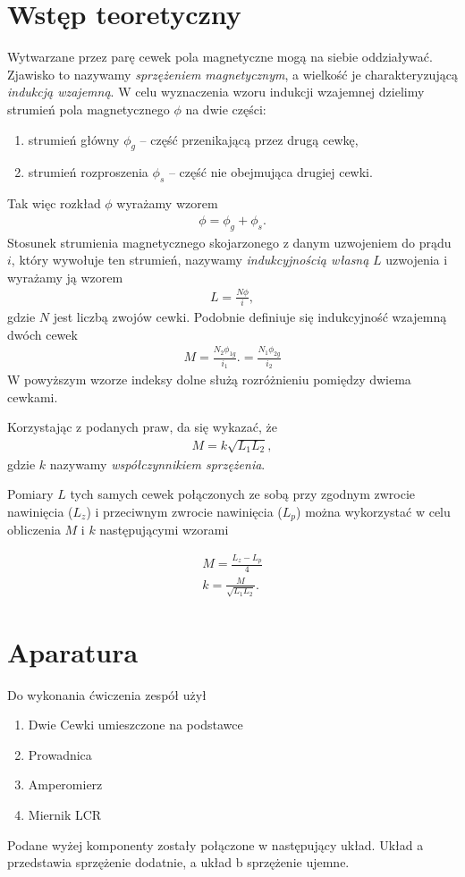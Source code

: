 \documentclass{article}
\begin{document}
\section{Wstęp teoretyczny}
Wytwarzane przez parę cewek pola magnetyczne mogą na siebie
oddziaływać.
Zjawisko to nazywamy \emph{sprzężeniem magnetycznym}, a wielkość je
charakteryzującą \emph{indukcją wzajemną}. W celu wyznaczenia wzoru
indukcji wzajemnej dzielimy strumień pola magnetycznego $\phi$ na
dwie części:
\begin{enumerate}
    \item strumień główny $\phi_g$ -- część przenikającą przez drugą cewkę,
    \item strumień rozproszenia $\phi_s$ -- część nie obejmująca
    drugiej cewki.
\end{enumerate}
Tak więc rozkład $\phi$ wyrażamy wzorem
\begin{align*}
    \phi = \phi_g + \phi_s.
\end{align*}
Stosunek strumienia magnetycznego skojarzonego z danym uzwojeniem do prądu $i$, który wywołuje ten
strumień, nazywamy \emph{indukcyjnością własną} $L$ uzwojenia i
wyrażamy ją wzorem
\begin{align*}
    L = \frac{N\phi}{i},
\end{align*}
gdzie $N$ jest liczbą zwojów cewki. Podobnie definiuje się indukcyjność
wzajemną dwóch cewek
\begin{align*}
    M = \frac{N_2\phi_{1g}}{i_1}. = \frac{N_1\phi_{2g}}{i_2}
    \label{eq:wzajemna}
\end{align*}
W powyższym wzorze indeksy dolne służą rozróżnieniu pomiędzy
dwiema cewkami.

Korzystając z podanych praw, da się wykazać, że
\begin{align}
    M = k\sqrt{L_1L_2},
\end{align}
gdzie $k$ nazywamy \emph{współczynnikiem sprzężenia}.

Pomiary $L$ tych samych cewek połączonych ze sobą przy zgodnym zwrocie
nawinięcia ($L_z$) i przeciwnym zwrocie nawinięcia ($L_p$) można wykorzystać w celu
obliczenia $M$ i $k$ następującymi wzorami

\begin{align}
    \label{eq:M}
    M = \frac{L_z - L_p}{4}\\
    \label{eq:k}
    k = \frac{M}{\sqrt{L_1L_2}}.
\end{align}

\pagebreak
\section{Aparatura}
Do wykonania ćwiczenia zespół użył 
\begin{enumerate}
    \item Dwie Cewki umieszczone na podstawce
    \item Prowadnica
    \item Amperomierz
    \item Miernik LCR
\end{enumerate}
Podane wyżej komponenty zostały połączone w następujący układ. Układ a przedstawia sprzężenie dodatnie, a układ b sprzężenie ujemne.
\end{document}
